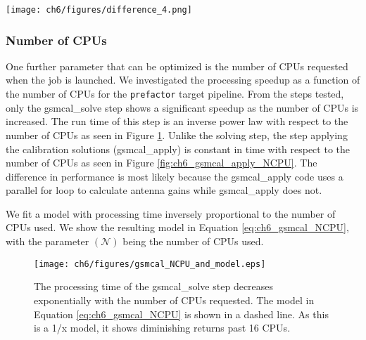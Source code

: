\begin{figure*}
    \texttt{[image: ch6/figures/difference\_4.png]}
      \caption[Comparison of data calibrated with four sky models]{Four images made using the \texttt{wsclean} software \citep{wsclean} from the data set\protect\footnotemark. The four images were calibrated with sky models of various flux cutoffs ranging from 0.05Jy (top left) to 1.5Jy (bottom right). Flux statistics for the green regions in the four images are listed in Table \ref{table:skymodel_RMS}. The top right, and bottom two quadrants show the pixel difference between the 0.05Jy image and the 0.3Jy, 0.8Jy and 1.5Jy images respectively. The four images are all on the same scaleThe green region shows the same area in all four quadrants.  }
	\label{fig:ch6_skymodel_images}
\end{figure*}



\subsubsection{Number of CPUs}
One further parameter that can be optimized is the number of CPUs requested when the job is launched. We investigated the processing speedup as a function of the number of CPUs for the \texttt{prefactor} target pipeline. From the steps tested, only the {\selectfont gsmcal\_solve} step shows a significant speedup as the number of CPUs is increased. The run time of this step is an inverse power law with respect to the number of CPUs as seen in Figure \ref{fig:ch6_gsmcal_solve_NCPU}. Unlike the solving step, the step applying the calibration solutions ({\selectfont gsmcal\_apply}) is constant in time with respect to the number of CPUs as seen in Figure \ref{fig:ch6_gsmcal_apply_NCPU}. The difference in performance is most likely because the {\selectfont gsmcal\_apply} code uses a parallel for loop to calculate antenna gains while {\selectfont gsmcal\_apply} does not. 

We fit a model with processing time inversely proportional to the number of CPUs used. We show the resulting model in Equation \ref{eq:ch6_gsmcal_NCPU}, with the parameter $(\mathcal{N})$ being the number of CPUs used. 

\begin{figure}
    \texttt{[image: ch6/figures/gsmcal\_NCPU\_and\_model.eps]}
      \caption{The processing time of the {\selectfont gsmcal\_solve} step decreases exponentially with the number of CPUs requested. The model in Equation \ref{eq:ch6_gsmcal_NCPU} is shown in a dashed line. As this is a 1/x model, it shows diminishing returns past 16 CPUs. }
	\label{fig:ch6_gsmcal_solve_NCPU}
\end{figure}

